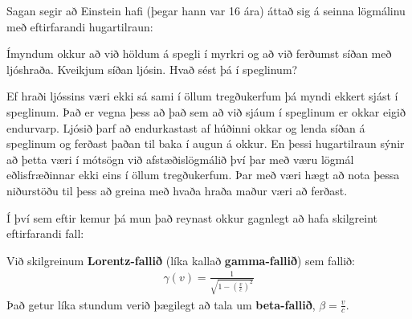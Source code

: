 \ifdefined \wholebook \else\documentclass[oneside]{book}\usepackage{EdlBook}\graphicspath{{figures/}}
\begin{document}
\vspace{0.1cm}

Sagan segir að Einstein hafi (þegar hann var 16 ára) áttað sig á seinna lögmálinu með eftirfarandi hugartilraun:

\vspace{0.1cm}

Ímyndum okkur að við höldum á spegli í myrkri og að við ferðumst síðan með ljóshraða. Kveikjum síðan ljósin. Hvað sést þá í speglinum?

\vspace{0.1cm}

Ef hraði ljóssins væri ekki sá sami í öllum tregðukerfum þá myndi ekkert sjást í speglinum. Það er vegna þess að það sem að við sjáum í speglinum er okkar eigið endurvarp. Ljósið þarf að endurkastast af húðinni okkar og lenda síðan á speglinum og ferðast þaðan til baka í augun á okkur. En þessi hugartilraun sýnir að þetta væri í mótsögn við afstæðislögmálið því þar með væru lögmál eðlisfræðinnar ekki eins í öllum tregðukerfum. Þar með væri hægt að nota þessa niðurstöðu til þess að greina með hvaða hraða maður væri að ferðast.

\vspace{0.1cm}

Í því sem eftir kemur þá mun það reynast okkur gagnlegt að hafa skilgreint eftirfarandi fall:

\begin{tcolorbox}
\begin{definition}
Við skilgreinum \textbf{Lorentz-fallið} (líka kallað \textbf{gamma-fallið}) sem fallið:
\begin{align*}
    \gamma(v) = \frac{1}{\sqrt{1 - \left(\frac{v}{c}\right)^2}}
\end{align*}
Það getur líka stundum verið þægilegt að tala um \textbf{beta-fallið}, $\beta = \frac{v}{c}$.
\end{definition}
\end{tcolorbox}
\end{document}
